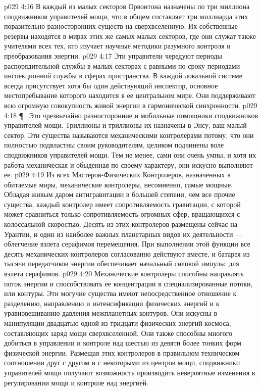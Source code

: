 \vs p029 4:16 В каждый из малых секторов Орвонтона назначены по три миллиона сподвижников управителей мощи, что в общем составляет три миллиарда этих поразительно разносторонних существ на сверхвселенную. Их собственные резервы находятся в мирах этих же самых малых секторов, где они служат также учителями всех тех, кто изучает научные методики разумного контроля и преобразования энергии.
\vs p029 4:17 Эти управители чередуют периоды распорядительной службы в малых секторах с равными по сроку периодами инспекционной службы в сферах пространства. В каждой локальной системе всегда присутствует хотя бы один действующий инспектор, основное местопребывание которого находится в ее центральном мире. Они поддерживают всю огромную совокупность живой энергии в гармонической синхронности.
\vs p029 4:18 \P\ \bibnobreakspace {} Это чрезвычайно разносторонние и мобильные помощники сподвижников управителей мощи. Триллионы и триллионы их назначены в Энсу, ваш малый сектор. Эти существа называются механическими контролерами потому, что они полностью подвластны своим руководителям, целиком подчинены воле сподвижников управителей мощи. Тем не менее, сами они очень умны, и хотя их работа механическая и обыденная по своему характеру, они искусно выполняют ее.
\vs p029 4:19 Из всех Мастеров\hyp{}Физических Контролеров, назначенных в обитаемые миры, механические контролеры, несомненно, самые мощные. Обладая живым даром антигравитации в большей степени, чем все прочие существа, каждый контролер имеет сопротивляемость гравитации, с которой может сравниться только сопротивляемость огромных сфер, вращающихся с колоссальной скоростью. Десять из этих контролеров размещены сейчас на Урантии, и один из наиболее важных планетарных видов их деятельности --- облегчение взлета серафимов перемещения. При выполнении этой функции все десять механических контролеров согласованно действуют вместе, и батарея из тысячи передатчиков энергии обеспечивает начальный силовой импульс для взлета серафимов.
\vs p029 4:20 Механические контролеры способны направлять поток энергии и способствовать ее концентрации в специализированные потоки, или контуры. Эти могучие существа имеют непосредственное отношение к разделению, направлению и интенсификации физических энергий и к уравновешиванию давления межпланетных контуров. Они искусны в манипуляции двадцатью одной из тридцати физических энергий космоса, составляющих заряд мощи сверхвселенной. Они также способны многого добиться в управлении и контроле над шестью из девяти более тонких форм физической энергии. Размещая этих контролеров в правильном техническом соотношении друг с другом и с некоторыми из центров мощи, сподвижники управителей мощи получают возможность производить невероятные изменения в регулировании мощи и контроле над энергией.
